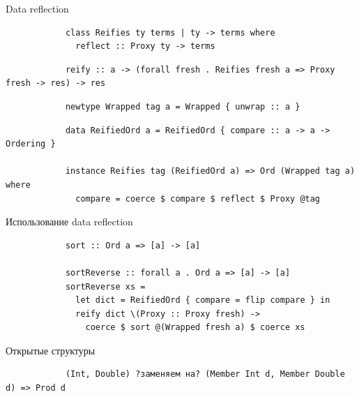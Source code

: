     \begin{frame}[fragile]{Data reflection}
        \pause
        \begin{verbatim}
            class Reifies ty terms | ty -> terms where
              reflect :: Proxy ty -> terms
        \end{verbatim}
        \pause\vspace{1em}
        \begin{verbatim}
            reify :: a -> (forall fresh . Reifies fresh a => Proxy fresh -> res) -> res
        \end{verbatim}
        \pause\vspace{1em}
        \begin{verbatim}
            newtype Wrapped tag a = Wrapped { unwrap :: a }
        \end{verbatim}
        \pause\vspace{1em}
        \begin{verbatim}
            data ReifiedOrd a = ReifiedOrd { compare :: a -> a -> Ordering }

            instance Reifies tag (ReifiedOrd a) => Ord (Wrapped tag a) where
              compare = coerce $ compare $ reflect $ Proxy @tag
        \end{verbatim}
    \end{frame}

    \begin{frame}[fragile]{Использование data reflection}
        \pause
        \begin{verbatim}
            sort :: Ord a => [a] -> [a]

            sortReverse :: forall a . Ord a => [a] -> [a]
            sortReverse xs =
              let dict = ReifiedOrd { compare = flip compare } in
              reify dict \(Proxy :: Proxy fresh) ->
                coerce $ sort @(Wrapped fresh a) $ coerce xs
        \end{verbatim}
    \end{frame}

    \begin{frame}[fragile]{Открытые структуры}
        \pause
        \begin{verbatim}
            (Int, Double) ?заменяем на? (Member Int d, Member Double d) => Prod d
        \end{verbatim}
    \end{frame}

